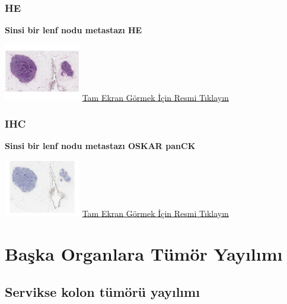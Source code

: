 \documentclass[
  letterpaper,
  DIV=11,
  numbers=noendperiod]{scrreprt}
\begin{document}
\hypertarget{he-7}{%
\subsection{HE}\label{he-7}}

\textbf{Sinsi bir lenf nodu metastazı HE}

\href{https://images.patolojiatlasi.com/insidious-lymph-node-metastasis/HE.html}{\includegraphics[width=0.25\textwidth,height=\textheight]{./screenshots/insidious-lymph-node-metastasis_screenshot.png}}
\href{https://images.patolojiatlasi.com/insidious-lymph-node-metastasis/HE.html}{Tam
Ekran Görmek İçin Resmi Tıklayın}

\hypertarget{ihc-1}{%
\subsection{IHC}\label{ihc-1}}

\textbf{Sinsi bir lenf nodu metastazı OSKAR panCK}

\href{https://images.patolojiatlasi.com/insidious-lymph-node-metastasis/HE.html}{\includegraphics[width=0.25\textwidth,height=\textheight]{./screenshots/insidious-lymph-node-metastasis-OSKARCK_screenshot.png}}
\href{https://images.patolojiatlasi.com/insidious-lymph-node-metastasis/OSKARCK.html}{Tam
Ekran Görmek İçin Resmi Tıklayın}

\hypertarget{sec-baska-organlara-tumor-yayilimi}{%
\chapter{Başka Organlara Tümör
Yayılımı}\label{sec-baska-organlara-tumor-yayilimi}}

\hypertarget{sec-servikse-kolon-tumor-yayilimi}{%
\section{Servikse kolon tümörü
yayılımı}\label{sec-servikse-kolon-tumor-yayilimi}}
\end{document}
